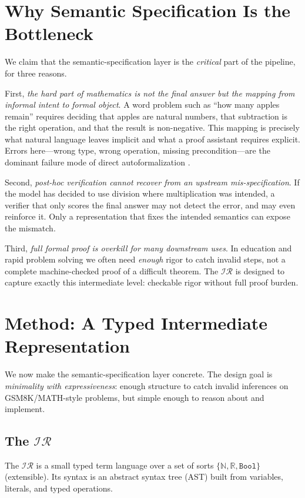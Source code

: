 \documentclass[11pt]{article}
\newcommand{\IR}{\ensuremath{\mathcal{IR}}}
\newcommand{\Nat}{\ensuremath{\mathbb{N}}}
\begin{document}
\section{Why Semantic Specification Is the Bottleneck}
\label{sec:bottleneck}

We claim that the semantic-specification layer is the \emph{critical} part of
the pipeline, for three reasons.

First, \emph{the hard part of mathematics is not the final answer but the
mapping from informal intent to formal object}. A word problem such as ``how
many apples remain'' requires deciding that apples are natural numbers, that
subtraction is the right operation, and that the result is non-negative. This
mapping is precisely what natural language leaves implicit and what a proof
assistant requires explicit. Errors here---wrong type, wrong operation, missing
precondition---are the dominant failure mode of direct autoformalization
\citep{wu2022autoformalization}.

Second, \emph{post-hoc verification cannot recover from an upstream
mis-specification}. If the model has decided to use division where
multiplication was intended, a verifier that only scores the final answer may
not detect the error, and may even reinforce it. Only a representation that
fixes the intended semantics can expose the mismatch.

Third, \emph{full formal proof is overkill for many downstream uses}. In
education and rapid problem solving we often need \emph{enough} rigor to catch
invalid steps, not a complete machine-checked proof of a difficult theorem.
The \IR{} is designed to capture exactly this intermediate level: checkable
rigor without full proof burden.
\section{Method: A Typed Intermediate Representation}
\label{sec:method}

We now make the semantic-specification layer concrete. The design goal is
\emph{minimality with expressiveness}: enough structure to catch invalid
inferences on GSM8K/MATH-style problems, but simple enough to reason about and
implement.

\subsection{The \IR{}}
\label{sec:ir}

The \IR{} is a small typed term language over a set of sorts
$\{\Nat, \mathbb{R}, \texttt{Bool}\}$ (extensible). Its syntax is an abstract
syntax tree (AST) built from variables, literals, and typed operations.
\end{document}
